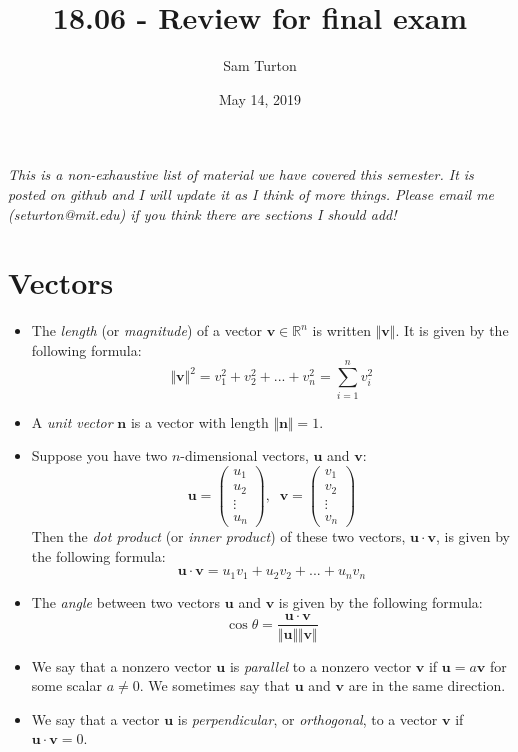 \documentclass[11pt]{article}
\title{18.06 - Review for final exam}
\author{Sam Turton}
\date{May 14, 2019}
\renewcommand*{\vec}[1]{\mathbf{#1}}
\begin{document}
\maketitle

\emph{This is a non-exhaustive list of material we have covered this semester. It is posted on github and I will update it as I think of more things. Please email me (seturton@mit.edu) if you think there are sections I should add!} 

\section{Vectors}
\begin{itemize}
\item The \emph{length} (or \emph{magnitude}) of a vector $\vec{v}\in\mathbb{R}^n$ is written $\Vert \vec{v} \Vert$. It is given by the following formula:
$$\boxed{\Vert \vec{v} \Vert^2 = v_1^2 + v_2^2 +...+ v_n^2 =  \sum_{i=1}^n v_i^2}$$
\item A \emph{unit vector} $\vec{n}$ is a vector with length $\Vert\vec{n}\Vert =1$. 
\item Suppose you have two $n$-dimensional vectors, $\vec{u}$ and $\vec{v}$:
$$\vec{u} = \begin{pmatrix} u_1 \\ u_2 \\ \vdots \\ u_n \end{pmatrix}, \;\; \vec{v} = \begin{pmatrix} v_1 \\ v_2 \\ \vdots \\ v_n \end{pmatrix}$$
Then the \emph{dot product} (or \emph{inner product}) of these two vectors, $\vec{u}\cdot\vec{v}$, is given by the following formula:
$$\boxed{\vec{u}\cdot\vec{v} = u_1v_1 + u_2v_2 + ... + u_nv_n}$$
\item The \emph{angle} between two vectors $\vec{u}$ and $\vec{v}$ is given by the following formula:
$$\boxed{\cos{\theta} = \frac{\vec{u}\cdot\vec{v}}{\Vert \vec{u}\Vert\Vert\vec{v}\Vert}}$$
\item We say that a nonzero vector $\vec{u}$ is \emph{parallel} to a nonzero vector $\vec{v}$ if $\boxed{\vec{u} = a\vec{v}}$ for some scalar $a\neq 0$. We sometimes say that $\vec{u}$ and $\vec{v}$ are in the same direction.
\item We say that a vector $\vec{u}$ is \emph{perpendicular}, or \emph{orthogonal}, to a vector $\vec{v}$ if $\boxed{\vec{u}\cdot\vec{v} = 0}$. 
\end{itemize}
\end{document}
